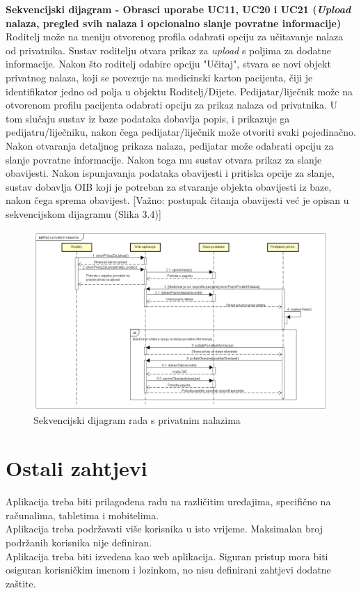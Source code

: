 				\textbf{Sekvencijski dijagram - Obrasci uporabe UC11, UC20 i UC21 (\textit{Upload} nalaza, pregled svih nalaza i opcionalno slanje povratne informacije)}\newline
					\text Roditelj može na meniju otvorenog profila odabrati opciju za učitavanje nalaza od privatnika. Sustav roditelju otvara prikaz za \textit{upload} s poljima za dodatne informacije. Nakon što roditelj odabire opciju "Učitaj", stvara se novi objekt privatnog nalaza, koji se povezuje na medicinski karton pacijenta, čiji je identifikator jedno od polja u objektu Roditelj/Dijete. Pedijatar/liječnik može na otvorenom profilu pacijenta odabrati opciju za prikaz nalaza od privatnika. U tom slučaju sustav iz baze podataka dobavlja popis, i prikazuje ga pedijatru/liječniku, nakon čega pedijatar/liječnik može otvoriti svaki pojedinačno. Nakon otvaranja detaljnog prikaza nalaza, pedijatar može odabrati opciju za slanje povratne informacije. Nakon toga mu sustav otvara prikaz za slanje obavijesti. Nakon ispunjavanja podataka obavijesti i pritiska opcije za slanje, sustav dobavlja OIB koji je potreban za stvaranje objekta obavijesti iz baze, nakon čega sprema obavijest. [Važno: postupak čitanja obavijesti već je opisan u sekvencijskom dijagramu (Slika 3.4)]
					\begin{figure}[H]
						\includegraphics[scale=0.4]{dijagrami/pedseq3.PNG} %
						\centering
						\caption{Sekvencijski dijagram rada s privatnim nalazima}
						\label{fig:seq4}
					\end{figure}
					\clearpage
				
					
				\eject
	
		\section{Ostali zahtjevi}
			 
			 \text Aplikacija treba biti prilagođena radu na različitim uređajima, specifično na računalima, tabletima i mobitelima. \\
			 \text Aplikacija treba podržavati više korisnika u isto vrijeme. Maksimalan broj podržanih korisnika nije definiran. \\
			 \text Aplikacija treba biti izvedena kao web aplikacija. Siguran pristup mora biti osiguran korisničkim imenom i lozinkom, no nisu definirani zahtjevi dodatne zaštite.
			 
			 
			 
	